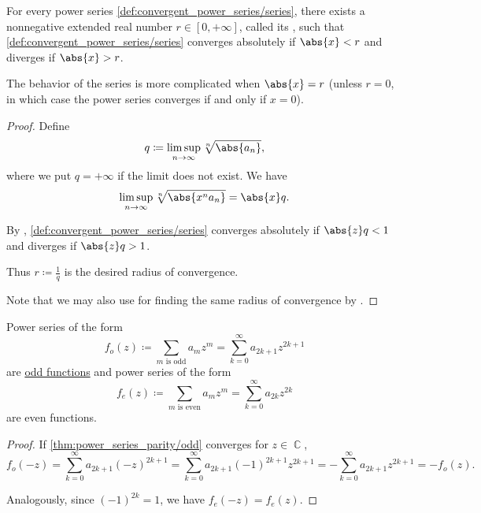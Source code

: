 \begin{theorem}\label{thm:power_series_radius_of_convergence}
  For every power series \eqref{def:convergent_power_series/series}, there exists a nonnegative extended real number \( r \in [0, +\infty] \), called its , such that \eqref{def:convergent_power_series/series} converges absolutely if \( \abs{x} < r \) and diverges if \( \abs{x} > r \).

  The behavior of the series is more complicated when \( \abs{x} = r \) (unless \( r = 0 \), in which case the power series converges if and only if \( x = 0 \)).
\end{theorem}
\begin{proof}
  Define
  \begin{equation*}
    q \coloneqq \limsup_{n \to \infty} \sqrt[n]{\abs{a_n}},
  \end{equation*}
  where we put \( q = +\infty \) if the limit does not exist. We have
  \begin{equation*}
    \limsup_{n \to \infty} \sqrt[n]{\abs{x^n a_n}} = \abs{x} q.
  \end{equation*}

  By , \eqref{def:convergent_power_series/series} converges absolutely if \( \abs{z} q < 1 \) and diverges if \( \abs{z} q > 1 \).

  Thus \( r \coloneqq \tfrac 1 q \) is the desired radius of convergence.

  Note that we may also use  for finding the same radius of convergence by .
\end{proof}

\begin{proposition}\label{thm:power_series_parity}
  Power series of the form
  \begin{equation}\label{thm:power_series_parity/odd}
    f_o(z) \coloneqq \sum_{m \text{ is odd}} a_m z^m = \sum_{k=0}^\infty a_{2k+1} z^{2k+1}
  \end{equation}
  are \hyperref[def:group/function_parity]{odd functions} and power series of the form
  \begin{equation}\label{thm:power_series_parity/even}
    f_e(z) \coloneqq \sum_{m \text{ is even}} a_m z^m = \sum_{k=0}^\infty a_{2k} z^{2k}
  \end{equation}
  are even functions.
\end{proposition}
\begin{proof}
  If \eqref{thm:power_series_parity/odd} converges for \( z \in \BbbC \),
  \begin{equation*}
    f_o(-z)
    =
    \sum_{k=0}^\infty a_{2k+1} (-z)^{2k+1}
    =
    \sum_{k=0}^\infty a_{2k+1} (-1)^{2k+1} z^{2k+1}
    =
    - \sum_{k=0}^\infty a_{2k+1} z^{2k+1}
    =
    - f_o(z).
  \end{equation*}

  Analogously, since \( (-1)^{2k} = 1 \), we have \( f_e(-z) = f_e(z) \).
\end{proof}

